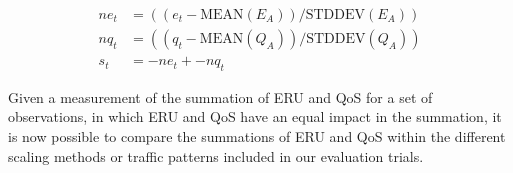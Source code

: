 \begin{align*}
  ne_{t} &= ((e_{t} - \mbox{MEAN}(E_{A})) / \mbox{STDDEV}(E_{A})) \\
  nq_{t} &= ((q_{t} - \mbox{MEAN}(Q_{A})) / \mbox{STDDEV}(Q_{A})) \\
  s_{t} &= -ne_{t} + -nq_{t}
\end{align*}

Given a measurement of the summation of ERU and QoS for a set
of observations, in which ERU and QoS have an equal impact in
the summation, it is now possible to compare the summations of ERU and
QoS within the different scaling methods or traffic patterns included
in our evaluation trials.
